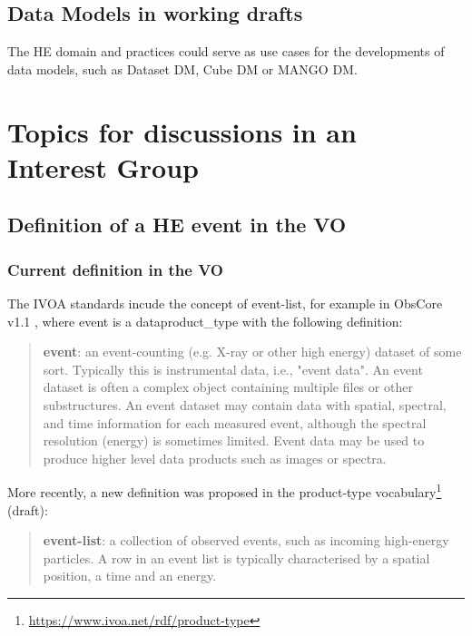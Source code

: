 \documentclass[11pt,a4paper]{ivoa}
\begin{document}


\subsection{Data Models in working drafts}

The HE domain and practices could serve as use cases for the developments of data models, such as Dataset DM, Cube DM or MANGO DM.


\section{Topics for discussions in an Interest Group}


\subsection{Definition of a HE event in the VO}
\label{sec:event-bundlle-or-list}

\subsubsection{Current definition in the VO}

The IVOA standards incude the concept of event-list, for example in ObsCore v1.1 \citep{2017ivoa.spec.0509L}, where
event is a dataproduct\_type with the following definition:
\begin{quote}
    \textbf{event}: an event-counting (e.g. X-ray or other high energy) dataset of some sort. Typically this is
    instrumental data, i.e., "event data". An event dataset is often a complex object containing multiple files or
    other substructures. An event dataset may contain data with spatial, spectral, and time information for each
    measured event, although the spectral resolution (energy) is sometimes limited. Event data may be used to produce
    higher level data products such as images or spectra.
\end{quote}

More recently, a new definition was proposed in the product-type vocabulary\footnote{\url{https://www.ivoa.net/rdf/product-type}} (draft):
\begin{quote}
    \textbf{event-list}: a collection of observed events, such as incoming high-energy particles. A row in an event
    list is typically characterised by a spatial position, a time and an energy.
\end{quote}
\end{document}
